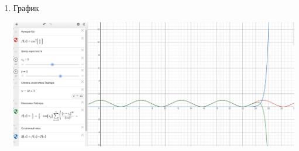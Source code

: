 \begin{enumerate}
\begin{enumerate}
    \end{enumerate}

    \item График

    \includegraphics[width=1.0\linewidth]{images/graph.png}
    
\end{enumerate}

\clearpage
